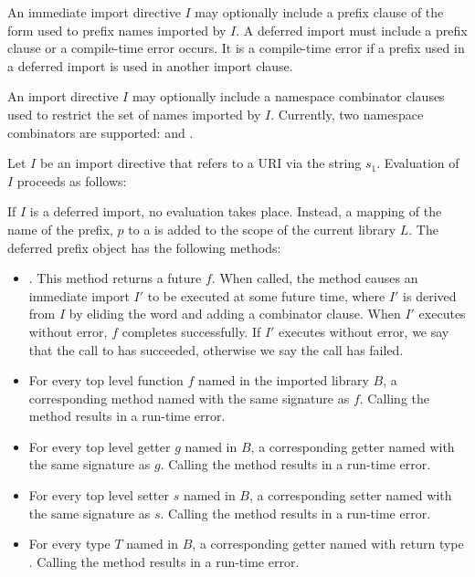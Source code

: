 \documentclass[makeidx]{article}
\begin{document}
{\LMHash{}%
An immediate import directive $I$ may optionally include a prefix clause of the form \code{\AS{} \id} used to prefix names imported by $I$.
A deferred import must include a prefix clause or a compile-time error occurs.
It is a compile-time error if a prefix used in a deferred import is used in another import clause.

\LMHash{}%
An import directive $I$ may optionally include a namespace combinator clauses used to restrict the set of names imported by $I$.
Currently, two namespace combinators are supported: \HIDE{} and \SHOW{}.

\LMHash{}%
Let $I$ be an import directive that refers to a URI via the string $s_1$.
Evaluation of $I$ proceeds as follows:

\LMHash{}%
If $I$ is a deferred import, no evaluation takes place.
Instead, a mapping of the name of the prefix, $p$ to a
 is added to
the scope of the current library $L$.
The deferred prefix object has the following methods:

\begin{itemize}
\item {}.
This method returns a future $f$.
When called, the method causes an immediate import $I'$ to be executed at some future time, where $I'$ is derived from $I$ by eliding the word \DEFERRED{} and adding a \HIDE{}  combinator clause.
When $I'$ executes without error, $f$ completes successfully.
If $I'$ executes without error, we say that the call to  has succeeded, otherwise we say the call has failed.
\item For every top level function $f$ named \id{} in the imported library $B$, a corresponding method named \id{} with the same signature as $f$.
Calling the method results in a run-time error.
\item For every top level getter $g$ named \id{} in $B$, a corresponding getter named \id{} with the same signature as $g$.
Calling the method results in a run-time error.
\item For every top level setter $s$ named \id{} in $B$, a corresponding setter named \id{} with the same signature as $s$.
Calling the method results in a run-time error.
\item For every type $T$ named \id{} in $B$, a corresponding getter named \id{} with return type .
Calling the method results in a run-time error.
\end{itemize}


}
\end{document}
